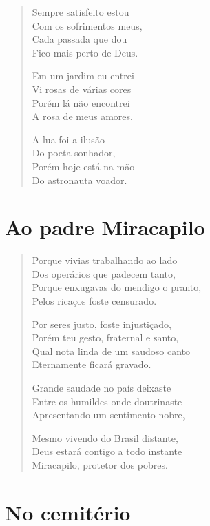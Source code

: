 \begin{verse}
Sempre satisfeito estou\\
Com os sofrimentos meus,\\
Cada passada que dou\\
Fico mais perto de Deus.

Em um jardim eu entrei\\
Vi rosas de várias cores\\
Porém lá não encontrei\\
A rosa de meus amores.

A lua foi a ilusão\\
Do poeta sonhador,\\
Porém hoje está na mão\\
Do astronauta voador.
\end{verse}

\chapter{Ao padre Miracapilo}

\begin{verse}
Porque vivias trabalhando ao lado\\
Dos operários que padecem tanto,\\
Porque enxugavas do mendigo o pranto,\\
Pelos ricaços foste censurado.

Por seres justo, foste injustiçado,\\
Porém teu gesto, fraternal e santo,\\
Qual nota linda de um saudoso canto\\
Eternamente ficará gravado.

Grande saudade no país deixaste\\
Entre os humildes onde doutrinaste\\
Apresentando um sentimento nobre,

Mesmo vivendo do Brasil distante,\\
Deus estará contigo a todo instante\\
Miracapilo, protetor dos pobres.
\end{verse}

\chapter{No cemitério}

